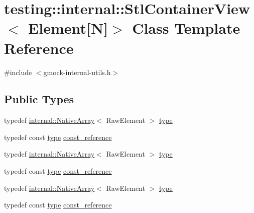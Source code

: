 \hypertarget{classtesting_1_1internal_1_1_stl_container_view_3_01_element[_n]_4}{}\section{testing\+::internal\+::Stl\+Container\+View$<$ Element\mbox{[}N\mbox{]}$>$ Class Template Reference}
\label{classtesting_1_1internal_1_1_stl_container_view_3_01_element[_n]_4}


{\ttfamily \#include $<$gmock-\/internal-\/utils.\+h$>$}

\subsection*{Public Types}
\begin{DoxyCompactItemize}
\item 
typedef \mbox{\hyperlink{classtesting_1_1internal_1_1_native_array}{internal\+::\+Native\+Array}}$<$ Raw\+Element $>$ \mbox{\hyperlink{classtesting_1_1internal_1_1_stl_container_view_3_01_element[_n]_4_a364efca99cc5a02829b4e3413c506b09}{type}}
\item 
typedef const \mbox{\hyperlink{classtesting_1_1internal_1_1_stl_container_view_3_01_element[_n]_4_a364efca99cc5a02829b4e3413c506b09}{type}} \mbox{\hyperlink{classtesting_1_1internal_1_1_stl_container_view_3_01_element[_n]_4_a481e6ab99316939484fad9c561af5e28}{const\+\_\+reference}}
\item 
typedef \mbox{\hyperlink{classtesting_1_1internal_1_1_native_array}{internal\+::\+Native\+Array}}$<$ Raw\+Element $>$ \mbox{\hyperlink{classtesting_1_1internal_1_1_stl_container_view_3_01_element[_n]_4_a364efca99cc5a02829b4e3413c506b09}{type}}
\item 
typedef const \mbox{\hyperlink{classtesting_1_1internal_1_1_stl_container_view_3_01_element[_n]_4_a364efca99cc5a02829b4e3413c506b09}{type}} \mbox{\hyperlink{classtesting_1_1internal_1_1_stl_container_view_3_01_element[_n]_4_a481e6ab99316939484fad9c561af5e28}{const\+\_\+reference}}
\item 
typedef \mbox{\hyperlink{classtesting_1_1internal_1_1_native_array}{internal\+::\+Native\+Array}}$<$ Raw\+Element $>$ \mbox{\hyperlink{classtesting_1_1internal_1_1_stl_container_view_3_01_element[_n]_4_a364efca99cc5a02829b4e3413c506b09}{type}}
\item 
typedef const \mbox{\hyperlink{classtesting_1_1internal_1_1_stl_container_view_3_01_element[_n]_4_a364efca99cc5a02829b4e3413c506b09}{type}} \mbox{\hyperlink{classtesting_1_1internal_1_1_stl_container_view_3_01_element[_n]_4_a481e6ab99316939484fad9c561af5e28}{const\+\_\+reference}}
\end{DoxyCompactItemize}
